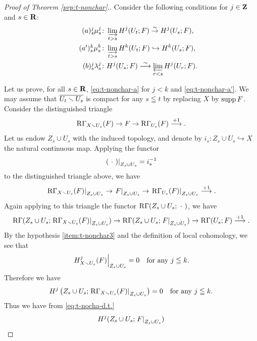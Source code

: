 \begin{proof}[{Proof of Theorem \ref{prp:t-nonchar}.}]
  Consider the following conditions for 
  \(j\in\zz\) and \(s\in\rr\):
  \begin{align}
      \tag*{\((a)^j_s\)}\label{eq:t-nonchar-a}
      \mu_{s}^{j}&\colon
      \indlim[t>s] H^{j}(U_t;F) \simar H^{j}(U_s;F),\\
      \tag*{\((a')^k_s\)}\label{eq:t-nonchar-a'}
      \mu_{s}^{k}&\colon
      \indlim[t>s] H^{k}(U_t;F) \hookrightarrow H^{k}(U_s;F),\\
      \tag*{\((b)^j_s\)}\label{eq:t-nonchar-b}
      \lambda_{s}^{j}&\colon
      H^{j}(U_s;F)\simarr \prolim[r<s] H^{j}(U_r;F).
  \end{align}

  Let us prove, 
  for all \(s\in \rr\), 
  \ref{eq:t-nonchar-a} for \(j<k\) and \ref{eq:t-nonchar-a'}. 
  We may assume that \(\overline{U_{t}\smi U_{s}}\) is compact 
  for any \(s\leqq t\) by replacing \(X\) by \(\supp{F}\). 
  Consider the distinguished triangle\[
    \RG_{X\smi U_{s}}(F)
    \to
    F
    \to
    \RG_{U_{s}}(F)
    \overset{+1}{\longrightarrow}.
  \]
  Let us endow \(Z_{s}\cup U_{s}\) with the induced topology, and
  denote by \(
    i_{s}\colon Z_{s}\cup U_{s}\hookrightarrow X
  \) the natural continuous map.  
  Applying the functor \[
    \mres[(\blk)]{Z_{s}\cup U_{s}}=i_{s}^{-1}
  \] to the distinguished triangle above, we have \[
    \mres[\RG_{X\smi U_{s}}(F)]{Z_{s}\cup U_{s}}  
    \to
    \mres[F]{Z_{s}\cup U_{s}}  
    \to
    \mres[\RG_{U_{s}}(F)]{Z_{s}\cup U_{s}}  
    \overset{+1}{\longrightarrow}.
  \]
  Again applying to this triangle 
  the functor \(\RG(Z_{s}\cup U_{s};\blk)\), 
  we have
  \begin{equation}\label{eq:t-nocha-d.t.}
    \RG(Z_{s}\cup U_{s};\mres[\RG_{X\smi U_{s}}(F)]{Z_{s}\cup U_{s}})
    \to
    \RG(Z_{s}\cup U_{s};\mres[F]{Z_{s}\cup U_{s}})
    \to
    \RG(U_{s};F)
    \overset{+1}{\longrightarrow}. 
  \end{equation}
  By the hypothesis \eqref{item:t-nonchar3} and 
  the definition of local cohomology, 
  we see that
  \[
    \mres[H^{j}_{X\smi U_{s}}(F)]{Z_{s}\cup U_{s}}=0
    \quad
    \text{for any \(j\leqq k\).}
  \]
  Therefore we have
  \[
    H^{j}\left(Z_{s}\cup U_{s};
      \mres[\RG_{X\smi U_{s}}(F)]{Z_{s}\cup U_{s}}
    \right)=0
    \quad
    \text{for any \(j\leqq k\).}
  \]
  Thus we have from \eqref{eq:t-nocha-d.t.}
  \begin{align}
    \label{eq:a-iso}
    H^{j}(Z_{s}\cup U_{s};\mres[F]{Z_{s}\cup U_{s}})

\end{align}
\end{proof}
